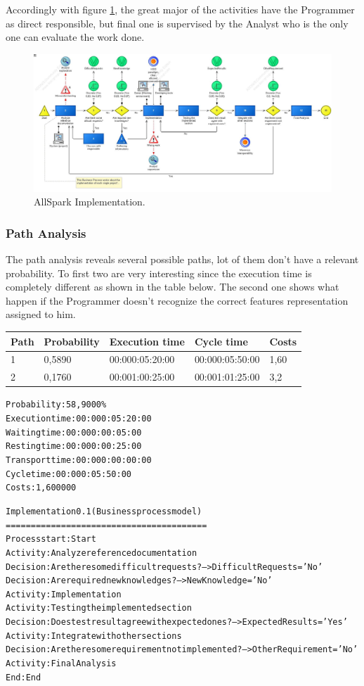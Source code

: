 Accordingly with figure \ref{2img:implementation}, the great major of the activities have the Programmer as direct responsible, but final one is supervised by the Analyst who is the only one can evaluate the work done.

\begin{figure}[ht!]
\begin{centering}
\includegraphics[scale=0.30, angle=90]{assign2/adonis/imgs/implementation.jpg}
\caption{AllSpark Implementation.}
\label{2img:implementation}
\end{centering}
\end{figure}


\subsubsection{Path Analysis}
The path analysis reveals several possible paths, lot of them don't have a relevant probability. To first two are very interesting since the execution time is completely different as shown in the table below. The second one shows what happen if the Programmer doesn't recognize the correct features representation assigned to him.

\begin{table}
\centering
\begin{tabular}{|l|l|l|l|l|}
Path&Probability&Execution time&Cycle time&Costs\\
\hline
1&0,5890&00:000:05:20:00&00:000:05:50:00&1,60\\
\hline
2&0,1760&00:001:00:25:00&00:001:01:25:00&3,2
\end{tabular}
\end{table}

\begin{alltt}
Probability:   58,9000\%
Execution time:  00:000:05:20:00
Waiting time:  00:000:00:05:00
Resting time:  00:000:00:25:00
Transport time:  00:000:00:00:00
Cycle time:  00:000:05:50:00
Costs:  1,600000

Implementation 0.1 (Business process model)
========================================
Process start: Start
Activity: Analyze reference documentation
Decision: Are there some difficult requests? --> DifficultRequests='No'
Decision: Are required new knowledges? --> NewKnowledge='No'
Activity: Implementation
Activity: Testing the implemented section
Decision: Does test result agree with expected ones? --> ExpectedResults='Yes'
Activity: Integrate with other sections
Decision: Are there some requirement not implemented? --> OtherRequirement='No'
Activity: Final Analysis
End: End
\end{alltt}

